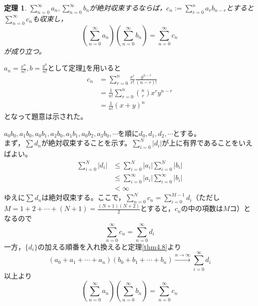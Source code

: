 \documentclass[dvipdfmx,a4j,10pt]{jsarticle}
\makeatletter
\theoremstyle{mystyle1}
\newtheorem{thm}[dfn]{定理}
\theoremstyle{mystyle2}
\newtheorem{ans}{解答}
\renewenvironment{proof}[1][\proofname]{\par
  \pushQED{\qed}%
  \normalfont
  \topsep6\p@\@plus6\p@ \trivlist
  \item[\hskip\labelsep{\bfseries\sffamily #1}]\ignorespaces
}{%
  \popQED\endtrivlist\@endpefalse
}
\renewcommand\proofname{証明}
\renewenvironment{ans}[1][解答]{\par
  \pushQED{\qed}%
  \normalfont
  \topsep6\p@\@plus6\p@ \trivlist
  \item[\hskip\labelsep{\bfseries\sffamily #1}]\ignorespaces
}{%
  \popQED\endtrivlist\@endpefalse
}
\makeatother
\begin{document}
\newpage

\begin{framed}
    \begin{thm}\label{thm4.9}
    	$\displaystyle\sum_{n=0}^\infty a_n,\sum_{n=0}^\infty b_n$が絶対収束するならば，$\displaystyle c_n:=\sum_{r=0}^n a_r b_{n-r}$とすると$\displaystyle \sum_{n=0}^\infty c_n$も収束し，
    	\[\left(\sum_{n=0}^\infty a_n\right) \left(\sum_{n=0}^\infty b_n\right)= \sum_{n=0}^\infty c_n\]
    	が成り立つ。
    \end{thm}
\end{framed}

\begin{ans}[例題\ref{ex4.1}の解答（後半）]
    $\displaystyle a_n=\frac{x^n}{n!},b=\frac{y^n}{n!}$として定理\ref{thm4.9}を用いると
    \[
    \begin{split}
    c_n&=\sum_{r=0}^n\frac{x^r}{r!}\frac{y^{n-r}}{(n-r)!}\\
    &=\frac{1}{n!}\sum_{r=0}^n\binom{n}{r}x^ry^{n-r}\\
    &=\frac{1}{n!}(x+y)^n
    \end{split}
    \]
    となって題意は示された。
\end{ans}

\begin{proof}[定理\ref{thm4.9}の証明]
    $a_0b_0,a_1b_0,a_0b_1,a_2b_0,a_1b_1,a_0b_2,a_3b_0,\cdots$を順に$d_0,d_1,d_2,\cdots$とする。\footnotemark\\
    まず，$\displaystyle\sum d_n$が絶対収束することを示す。$\displaystyle \sum_{i=0}^N |d_i|$が上に有界であることをいえばよい。
    \[
    \begin{split}
    \sum_{i=0}^N|d_i|&\leq \sum_{i=0}^N|a_i| \sum_{i=0}^N|b_i|\\
    &\leq \sum_{i=0}^\infty |a_i| \sum_{i=0}^\infty |b_i|\\
    &<\infty
    \end{split}
    \]
    ゆえに$\displaystyle\sum d_n$は絶対収束する。ここで，$\displaystyle \sum_{n=0}^N c_n = \sum_{i=0}^{M-1}d_i$（ただし$\displaystyle M=1+2+\cdots+(N+1)=\frac{(N+1)(N+2)}{2}$とすると，$c_n$の中の項数は$M$コ）となるので
    \[\sum_{n=0}^\infty c_n = \sum_{n=0}^\infty d_i\]
    一方，$\{d_i\}$の加える順番を入れ換えると定理\ref{thm4.8}より
    \[(a_0+a_1+\cdots+a_n)(b_0+b_1+\cdots+b_n) \overset{n\to\infty}{\longrightarrow}\sum_{i=0}^\infty d_i\]
    以上より
    \[\left(\sum_{n=0}^\infty a_n\right) \left(\sum_{n=0}^\infty b_n\right)= \sum_{n=0}^\infty c_n\]
\end{proof}
\end{document}
